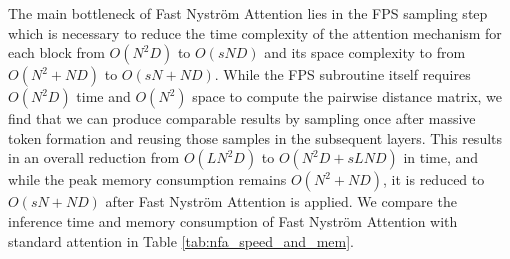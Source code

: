 \documentclass[10pt,twocolumn,letterpaper]{article}
\begin{document}
\begin{table}[H]
    \centering
    \footnotesize
    \vspace{-0.5em}
    \caption{Memory consumption and running time results on various sequence lengths. We report the average memory consumption and running time for one input batch (batch size = 8) through a standard self-attention module (from scratch) and our Fast Nystr\"om Attention (sample size = 64). }
    \label{tab:nfa_speed_and_mem}
\end{table}






The main bottleneck of Fast Nystr\"om Attention lies in the FPS sampling step which is necessary to reduce the time complexity of the attention mechanism for each block from $O(N^2D)$ to $O(sND)$ and its space complexity to from $O(N^2 + ND)$ to $O(sN + ND)$. While the FPS subroutine itself requires $O(N^2D)$ time and $O(N^2)$ space to compute the pairwise distance matrix, we find that we can produce comparable results by sampling once after massive token formation and reusing those samples in the subsequent layers. This results in an overall reduction from $O(LN^2D)$ to $O(N^2D + sLND)$ in time, and while the peak memory consumption remains $O(N^2 + ND)$, it is reduced to $O(sN + ND)$ after Fast Nystr\"om Attention is applied. We compare the inference time and memory consumption of Fast Nystr\"om Attention with standard attention in Table \ref{tab:nfa_speed_and_mem}. 
\end{document}
